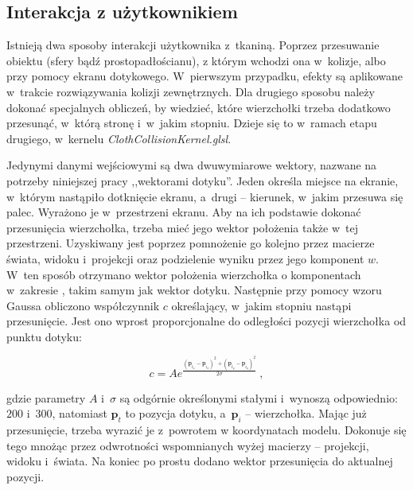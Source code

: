 		\subsection{Interakcja z użytkownikiem}
		\label{t:symulacja:dzialanie:interakcja}
			
		
		Istnieją dwa sposoby interakcji użytkownika z~tkaniną. Poprzez przesuwanie obiektu (sfery bądź prostopadłościanu), z którym wchodzi ona w~kolizje, albo przy pomocy ekranu dotykowego. W~pierwszym przypadku, efekty są aplikowane w~trakcie rozwiązywania kolizji zewnętrznych. Dla drugiego sposobu należy dokonać specjalnych obliczeń, by wiedzieć, które wierzchołki trzeba dodatkowo przesunąć, w~którą stronę i~w~jakim stopniu. Dzieje się to w~ramach etapu drugiego, w~kernelu \emph{ClothCollisionKernel.glsl}.
		
		Jedynymi danymi wejściowymi są dwa dwuwymiarowe wektory, nazwane na potrzeby niniejszej pracy ,,wektorami dotyku''. Jeden określa miejsce na ekranie, w~którym nastąpiło dotknięcie ekranu, a~drugi -- kierunek, w~jakim przesuwa się palec. Wyrażono je w~przestrzeni ekranu. Aby na ich podstawie dokonać przesunięcia wierzchołka, trzeba mieć jego wektor położenia także w~tej przestrzeni. Uzyskiwany jest poprzez pomnożenie go kolejno przez macierze świata, widoku i~projekcji oraz podzielenie wyniku przez jego komponent \(w\). W~ten sposób otrzymano wektor położenia wierzchołka o komponentach w~zakresie \(<-1, 1>\), takim samym jak wektor dotyku. Następnie przy pomocy wzoru Gaussa obliczono współczynnik \(c\) określający, w~jakim stopniu nastąpi przesunięcie. Jest ono wprost proporcjonalne do odległości pozycji wierzchołka od punktu dotyku:
		
		
		\begin{equation}
		c = Ae^{\frac{(\mathbf{p}_{t_{x}} - \mathbf{p}_{i_{x}})^{2} + (\mathbf{p}_{t_{y}} - \mathbf{p}_{i_{y}})^{2}}{2 \sigma}} \ ,
		\end{equation} 
		
		gdzie parametry \( A \) i~\( \sigma \) są odgórnie określonymi stałymi i~wynoszą odpowiednio: \(200\) i~\(300\), natomiast \( \mathbf{p}_{t} \) to pozycja dotyku, a~\( \mathbf{p}_{i} \)  -- wierzchołka. Mając już przesunięcie, trzeba wyrazić je z~powrotem w koordynatach modelu. Dokonuje się tego mnożąc przez odwrotności wspomnianych wyżej macierzy -- projekcji, widoku i~świata. Na koniec po prostu dodano wektor przesunięcia do aktualnej pozycji.
		\newpage
		
